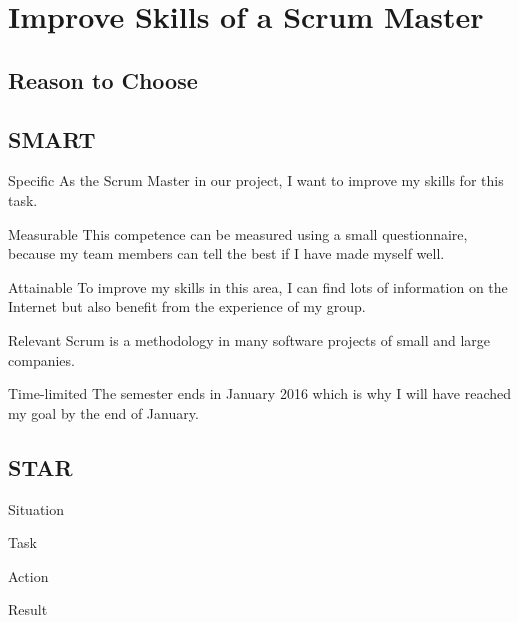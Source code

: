 \section{Improve Skills of a Scrum Master}
	\subsection{Reason to Choose}
		

	\subsection{SMART}
	\begin{SMART}
	    \item[Specific] As the Scrum Master in our project, I want to improve my skills for this task.
	    \item[Measurable] This competence can be measured using a small questionnaire, because my team members can tell the best if I have made myself well.
	    \item[Attainable] To improve my skills in this area, I can find lots of information on the Internet but also benefit from the experience of my group.
	    \item[Relevant] Scrum is a methodology in many software projects of small and large companies.
	    \item[Time-limited] The semester ends in January 2016 which is why I will have reached my goal by the end of January.
	\end{SMART}
	
	\subsection{STAR}
	\begin{STAR}
	    \item[Situation] 
	    \item[Task] 
	    \item[Action] 
	    \item[Result] 
	\end{STAR}